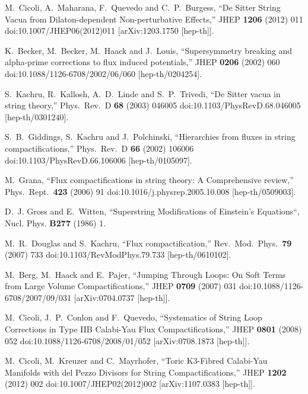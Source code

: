 \documentclass[11pt,a4paper]{article}
\begin{document}
\begin{thebibliography}{99}
  M.~Cicoli, A.~Maharana, F.~Quevedo and C.~P.~Burgess,
  ``De Sitter String Vacua from Dilaton-dependent Non-perturbative Effects,''
  JHEP {\bf 1206} (2012) 011
  doi:10.1007/JHEP06(2012)011
  [arXiv:1203.1750 [hep-th]].
	
  K.~Becker, M.~Becker, M.~Haack and J.~Louis,
  ``Supersymmetry breaking and alpha-prime corrections to flux induced potentials,''
  JHEP {\bf 0206} (2002) 060
  doi:10.1088/1126-6708/2002/06/060
  [hep-th/0204254].

  S.~Kachru, R.~Kallosh, A.~D.~Linde and S.~P.~Trivedi,
  ``De Sitter vacua in string theory,''
  Phys.\ Rev.\ D {\bf 68} (2003) 046005
  doi:10.1103/PhysRevD.68.046005
  [hep-th/0301240].
	
  S.~B.~Giddings, S.~Kachru and J.~Polchinski,
  ``Hierarchies from fluxes in string compactifications,''
  Phys.\ Rev.\ D {\bf 66} (2002) 106006
  doi:10.1103/PhysRevD.66.106006
  [hep-th/0105097].

  M.~Grana,
  ``Flux compactifications in string theory: A Comprehensive review,''
  Phys.\ Rept.\  {\bf 423} (2006) 91
  doi:10.1016/j.physrep.2005.10.008
  [hep-th/0509003].

D.~J. Gross and E.~Witten, ``Superstring Modifications of Einstein's
  Equations``,   Nucl. Phys. {\bf B277} (1986) 1.
  
  M.~R.~Douglas and S.~Kachru,
  ``Flux compactification,''
  Rev.\ Mod.\ Phys.\  {\bf 79} (2007) 733
  doi:10.1103/RevModPhys.79.733
  [hep-th/0610102].

  M.~Berg, M.~Haack and E.~Pajer,
  ``Jumping Through Loops: On Soft Terms from Large Volume Compactifications,''
  JHEP {\bf 0709} (2007) 031
  doi:10.1088/1126-6708/2007/09/031
  [arXiv:0704.0737 [hep-th]].
	
  M.~Cicoli, J.~P.~Conlon and F.~Quevedo,
  ``Systematics of String Loop Corrections in Type IIB Calabi-Yau Flux Compactifications,''
  JHEP {\bf 0801} (2008) 052
  doi:10.1088/1126-6708/2008/01/052
  [arXiv:0708.1873 [hep-th]].

  M.~Cicoli, M.~Kreuzer and C.~Mayrhofer,
  ``Toric K3-Fibred Calabi-Yau Manifolds with del Pezzo Divisors for String Compactifications,''
  JHEP {\bf 1202} (2012) 002
  doi:10.1007/JHEP02(2012)002
  [arXiv:1107.0383 [hep-th]].


\end{thebibliography}
\end{document}
